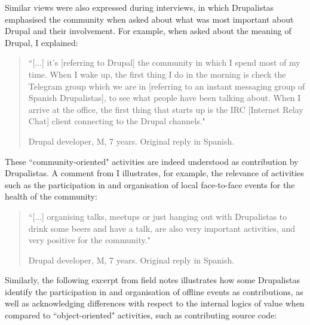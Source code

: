 Similar views were also expressed during interviews, in which Drupalistas emphasised the community when asked about what was most important about Drupal and their involvement. For example, when asked about the meaning of Drupal, I explained:

\begin{quotation}
    ``[...] it's [referring to Drupal] the community in which I spend most of my time. When I wake up, the first thing I do in the morning is check the Telegram group  which we are in [referring to an instant messaging group of Spanish Drupalistas], to see what people have been talking about. When I arrive at the office, the first thing that starts up is the IRC [Internet Relay Chat] client connecting to the Drupal channels."

\begin{flushright}\footnotesize{Drupal developer, M, 7 years. Original reply in Spanish.}\end{flushright}
\end{quotation}

These ``community-oriented" activities are indeed understood as contribution by Drupalistas. A comment from I illustrates, for example, the relevance of activities such as the participation in and organisation of local face-to-face events for the health of the community:

\begin{quotation}
    ``[...] organising talks, meetups or just hanging out with Drupalistas to drink some beers and have a talk, are also very important activities, and very positive for the community."

\begin{flushright}\footnotesize{Drupal developer, M, 7 years. Original reply in Spanish.}\end{flushright}
\end{quotation}

Similarly, the following excerpt from field notes illustrates how some Drupalistas identify the participation in and organisation of offline events as contributions, as well as acknowledging differences with respect to the internal logics of value when compared to ``object-oriented" activities, such as contributing source code:


